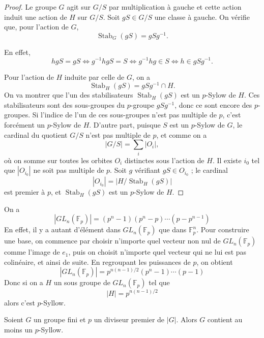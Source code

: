 \begin{proof}
    Le groupe \( G \) agit sur \( G/S \) par multiplication à gauche et cette action induit une action de \( H \) sur \( G/S \). Soit \( gS \in G/S \) une classe à gauche. On vérifie que, pour l’action de \( G \),
    \[
    \operatorname{Stab}_G(gS) = gSg^{-1}.
    \]
    
    En effet,
    \[
    hgS = gS \Longleftrightarrow g^{-1}hgS = S
    \Longleftrightarrow g^{-1}hg \in S
    \Longleftrightarrow h \in gSg^{-1}.
    \]
    
    Pour l’action de \( H \) induite par celle de \( G \), on a
    \[
    \operatorname{Stab}_H(gS) = gSg^{-1} \cap H.
    \]
    On va montrer que l’un des stabilisateurs \( \operatorname{Stab}_H(gS) \) est un \( p \)-Sylow de \( H \). Ces stabilisateurs sont des sous-groupes du \( p \)-groupe \( gSg^{-1} \), donc ce sont encore des \( p \)-groupes. Si l’indice de l’un de ces sous-groupes n’est pas multiple de \( p \), c’est forcément un \( p \)-Sylow de \( H \). D’autre part, puisque \( S \) est un \( p \)-Sylow de \( G \), le cardinal du quotient \( G/S \) n’est pas multiple de \( p \), et comme on a
    \[
    |G/S| = \sum_{i} |O_i|,
    \]
    où on somme sur toutes les orbites \( O_i \) distinctes sous l’action de \( H \). Il existe \( i_0 \) tel que \( |O_{i_0}| \) ne soit pas multiple de \( p \). Soit \( g \) vérifiant \( gS \in O_{i_0} \) ; le cardinal 
    \[
    |O_{i_0}| = |H / \operatorname{Stab}_H(gS)|
    \]
    est premier à \( p \), et \( \operatorname{Stab}_H(gS) \) est un \( p \)-Sylow de \( H \).
\end{proof}

\begin{remarque}
    On a 
    \[
    |GL_n(\mathbb{F}_p)|=(p^n-1)(p^n-p)\cdots(p-p^{n-1})
    \]
    En effet, il y a autant d'élément dans $GL_n(\mathbb{F}_p)$ que dans $\mathbb{F}_p^n$. Pour construire une base, on commence par choisir n'importe quel vecteur non nul de $GL_n(\mathbb{F}_p)$ comme l'image de $e_1$, puis on choisit n'importe quel vecteur qui ne lui est pas colinéaire, et ainsi de suite. En regroupant les puissances de $p$, on obtient
    \[
    |GL_n(\mathbb{F}_p)|=p^{n(n-1)/2}(p^n-1)\cdots(p-1)
    \]
    Donc si on a $H$ un sous groupe de $GL_n(\mathbb{F}_p)$ tel que
    \[
    |H|=p^{n(n-1)/2}
    \]
    alors c'est $p$-Syllow.
\end{remarque}

\begin{theoreme}
        Soient $G$ un groupe fini et $p$ un diviseur premier de $|G|$. Alors $G$ contient au moins un $p$-Syllow.
\end{theoreme}

